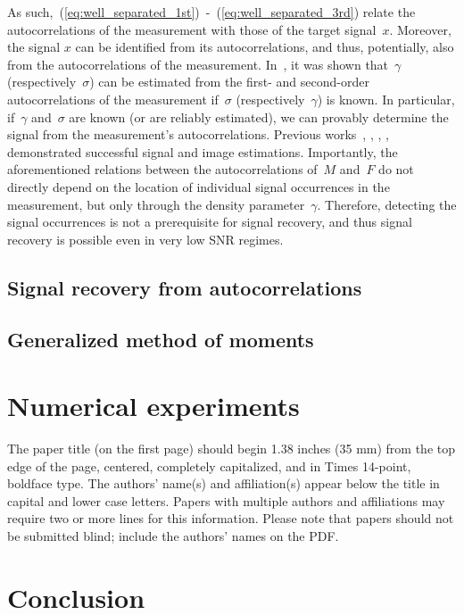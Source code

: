 \documentclass{article}
\begin{document}
As such,~\mbox{(\ref{eq:well_separated_1st}) -~(\ref{eq:well_separated_3rd})} relate the autocorrelations of the measurement with those of the target signal~$x$. Moreover, the signal $x$ can be identified from its autocorrelations, and thus, potentially, also from the autocorrelations of the measurement. In~\cite{bendory2019multi}, it was shown that~$\gamma$ (respectively~$\sigma$) can be estimated from the first- and second-order autocorrelations of the measurement if~$\sigma$ (respectively~$\gamma$) is known. In particular, if~$\gamma$ and~$\sigma$ are known (or are reliably estimated), we can provably determine the signal from the measurement's autocorrelations. Previous works~\cite{bendory2019multi}, \cite{lan2020multi}, \cite{marshall2020image}, \cite{bendory2021multi}, \cite{kreymer2021two} demonstrated successful signal and image estimations. Importantly, the aforementioned relations between the autocorrelations of~$M$ and~$F$ do not directly depend on the location of individual signal occurrences in the measurement, but only through the density parameter~$\gamma$. Therefore, detecting the signal occurrences is not a prerequisite for signal recovery, and thus signal recovery is possible even in very low SNR regimes.

\subsection{Signal recovery from autocorrelations}

\subsection{Generalized method of moments}
\label{subsec:gmm}


\section{Numerical experiments}
\label{sec:numerical}

The paper title (on the first page) should begin 1.38 inches (35 mm) from the
top edge of the page, centered, completely capitalized, and in Times 14-point,
boldface type.  The authors' name(s) and affiliation(s) appear below the title
in capital and lower case letters.  Papers with multiple authors and
affiliations may require two or more lines for this information. Please note
that papers should not be submitted blind; include the authors' names on the
PDF.

\section{Conclusion}
\label{sec:conclusion}



\vfill\pagebreak



\end{document}
